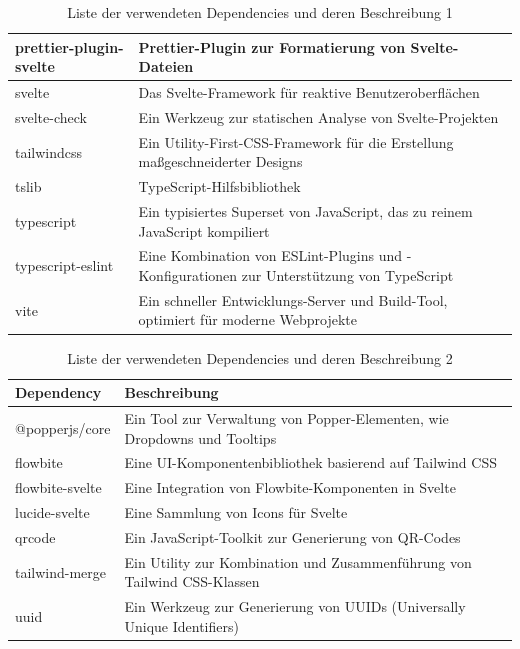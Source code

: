 \begin{table}[H]
\begin{tabularx}{\textwidth}{|l|X|}
    \hline
    prettier-plugin-svelte & Prettier-Plugin zur Formatierung von Svelte-Dateien \\
    \hline
    svelte & Das Svelte-Framework für reaktive Benutzeroberflächen \\
    \hline
    svelte-check & Ein Werkzeug zur statischen Analyse von Svelte-Projekten \\
    \hline
    tailwindcss & Ein Utility-First-CSS-Framework für die Erstellung maßgeschneiderter Designs \\
    \hline
    tslib & TypeScript-Hilfsbibliothek \\
    \hline
    typescript & Ein typisiertes Superset von JavaScript, das zu reinem JavaScript kompiliert \\
    \hline
    typescript-eslint & Eine Kombination von ESLint-Plugins und -Konfigurationen zur Unterstützung von TypeScript \\
    \hline
    vite & Ein schneller Entwicklungs-Server und Build-Tool, optimiert für moderne Webprojekte \\
    \hline
    
    \end{tabularx}
    \caption{Liste der verwendeten Dependencies und deren Beschreibung 1}
    \label{tab:dependencies-1}
\end{table}


\begin{table}[H]
    \centering
    \begin{tabularx}{\textwidth}{|l|X|}
    \hline
    \textbf{Dependency} & \textbf{Beschreibung} \\
    \hline
    @popperjs/core & Ein Tool zur Verwaltung von Popper-Elementen, wie Dropdowns und Tooltips \\
    \hline
    flowbite & Eine UI-Komponentenbibliothek basierend auf Tailwind CSS \\
    \hline
    flowbite-svelte & Eine Integration von Flowbite-Komponenten in Svelte \\
    \hline
    lucide-svelte & Eine Sammlung von Icons für Svelte \\
    \hline
    qrcode & Ein JavaScript-Toolkit zur Generierung von QR-Codes \\
    \hline
    tailwind-merge & Ein Utility zur Kombination und Zusammenführung von Tailwind CSS-Klassen \\
    \hline
    uuid & Ein Werkzeug zur Generierung von UUIDs (Universally Unique Identifiers) \\
    \hline
    \end{tabularx}
    \caption{Liste der verwendeten Dependencies und deren Beschreibung 2}
    \label{tab:dependencies-2}
\end{table}


